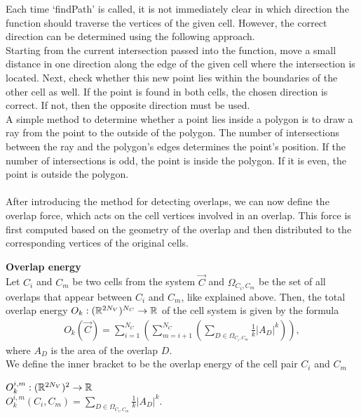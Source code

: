 Each time `findPath' is called, it is not immediately clear in which direction the function should traverse the vertices of the given cell. 
However, the correct direction can be determined using the following approach. \\
Starting from the current intersection passed into the function, move a small distance in one direction along the edge of the given cell where the intersection is located. Next, check whether this new point lies within the boundaries of the other cell as well. 
If the point is found in both cells, the chosen direction is correct. 
If not, then the opposite direction must be used. \\ 
A simple method to determine whether a point lies inside a polygon is to draw a ray from the point to the outside of the polygon. 
The number of intersections between the ray and the polygon's edges determines the point's position. 
If the number of intersections is odd, the point is inside the polygon.
If it is even, the point is outside the polygon. \\ 
\smallskip  \\
After introducing the method for detecting overlaps, we can now define the overlap force, which acts on the cell vertices involved in an overlap. 
This force is first computed based on the geometry of the overlap and then distributed to the corresponding vertices of the original cells. 

\begin{definition} \textbf{Overlap energy} \\
	Let $C_i$ and $C_m$ be two cells from the system $\vec{C}$ and $\Omega_{C_i,C_m}$ be the set of all overlaps that appear between $C_i$ and $C_m$, like explained above. Then, the total overlap energy $O_k : (\mathbb{R}^{2N_V})^{N_C} \rightarrow \mathbb{R}$ of the cell system is given by the formula 
	\begin{align}
		O_k(\vec{C}) = \sum\limits_{i=1}^{N_C} \left( \sum\limits_{m=i+1}^{N_C} \left(\sum\limits_{D \in \Omega_{C_i,C_m}} \frac{1}{k}|A_{D}|^k\right) \right),		
	\end{align} 
	where $A_{D}$ is the area of the overlap $D$.  \\
	We define the inner bracket to be the overlap energy of the cell pair $C_i$ and $C_m$
	\begin{center}
		$O_k^{i,m}: (\mathbb{R}^{2 N_V})^2 \rightarrow \mathbb{R}$ \\[0.5em]
		$O_k^{i,m}(C_i, C_m) = \sum\limits_{D \in \Omega_{C_i,C_m}} \frac{1}{k}|A_{D}|^k.$
	\end{center} 
\end{definition}

